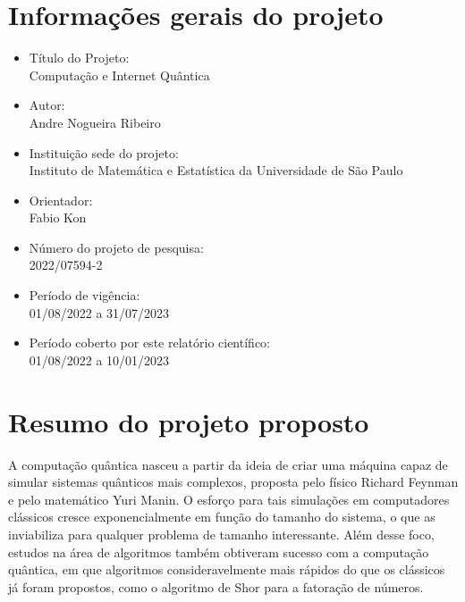 \documentclass{article}
\begin{document}
\section{Informações gerais do projeto}
    \begin{itemize}
        \item \large Título do Projeto: \\ Computação e Internet Quântica 
    \end{itemize}
    \begin{itemize}
        \item \large Autor: \\
        Andre Nogueira Ribeiro
    \end{itemize}
    \begin{itemize}
        \item \large Instituição sede do projeto: \\
        Instituto de Matemática e Estatística da Universidade de São Paulo
    \end{itemize}
    \begin{itemize}
        \item \large Orientador: \\
        Fabio Kon
    \end{itemize}
    \begin{itemize}
        \item \large Número do projeto de pesquisa:\\
        2022/07594-2 
    \end{itemize}
    \begin{itemize}
        \item \large Período de vigência: \\
        01/08/2022 a 31/07/2023 
    \end{itemize}
    \begin{itemize}
        \item \large Período coberto por este relatório científico: \\
        01/08/2022 a 10/01/2023 
    \end{itemize}
    
    \newpage

\section{Resumo do projeto proposto}
    
    A computação quântica nasceu a partir da ideia de criar uma máquina capaz de simular sistemas quânticos mais complexos, proposta pelo físico Richard Feynman e pelo matemático Yuri Manin. O esforço para tais simulações em computadores clássicos cresce exponencialmente em função do tamanho do sistema, o que as inviabiliza para qualquer problema de tamanho interessante. Além desse foco, estudos na área de algoritmos também obtiveram sucesso com a computação quântica, em que algoritmos consideravelmente mais rápidos do que os clássicos já foram propostos, como o algoritmo de Shor para a fatoração de números.
    
\end{document}
